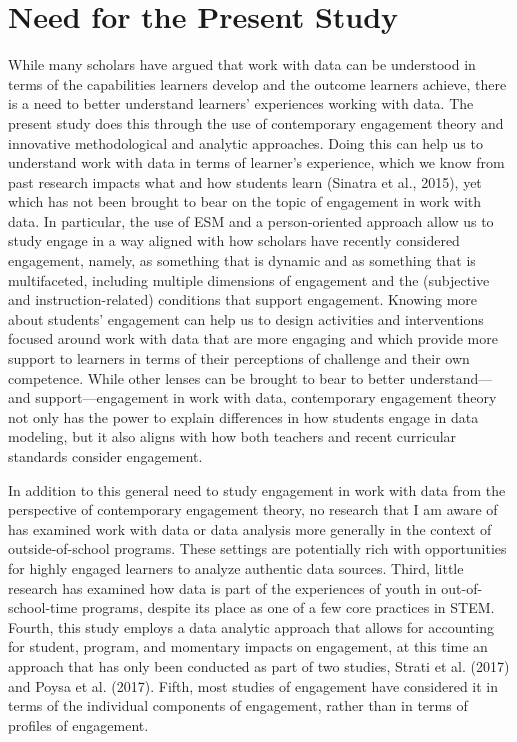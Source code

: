 \documentclass[]{msu-thesis}
\theoremstyle{definition}
\theoremstyle{definition}
\theoremstyle{definition}
\theoremstyle{remark}
\begin{document}
\section{Need for the Present Study}\label{need-for-the-present-study}

While many scholars have argued that work with data can be understood in
terms of the capabilities learners develop and the outcome learners
achieve, there is a need to better understand learners' experiences
working with data. The present study does this through the use of
contemporary engagement theory and innovative methodological and
analytic approaches. Doing this can help us to understand work with data
in terms of learner's experience, which we know from past research
impacts what and how students learn (Sinatra et al., 2015), yet which
has not been brought to bear on the topic of engagement in work with
data. In particular, the use of ESM and a person-oriented approach allow
us to study engage in a way aligned with how scholars have recently
considered engagement, namely, as something that is dynamic and as
something that is multifaceted, including multiple dimensions of
engagement and the (subjective and instruction-related) conditions that
support engagement. Knowing more about students' engagement can help us
to design activities and interventions focused around work with data
that are more engaging and which provide more support to learners in
terms of their perceptions of challenge and their own competence. While
other lenses can be brought to bear to better understand---and
support---engagement in work with data, contemporary engagement theory
not only has the power to explain differences in how students engage in
data modeling, but it also aligns with how both teachers and recent
curricular standards consider engagement.

In addition to this general need to study engagement in work with data
from the perspective of contemporary engagement theory, no research that
I am aware of has examined work with data or data analysis more
generally in the context of outside-of-school programs. These settings
are potentially rich with opportunities for highly engaged learners to
analyze authentic data sources. Third, little research has examined how
data is part of the experiences of youth in out-of-school-time programs,
despite its place as one of a few core practices in STEM. Fourth, this
study employs a data analytic approach that allows for accounting for
student, program, and momentary impacts on engagement, at this time an
approach that has only been conducted as part of two studies, Strati et
al. (2017) and Poysa et al. (2017). Fifth, most studies of engagement
have considered it in terms of the individual components of engagement,
rather than in terms of profiles of engagement.
\end{document}
